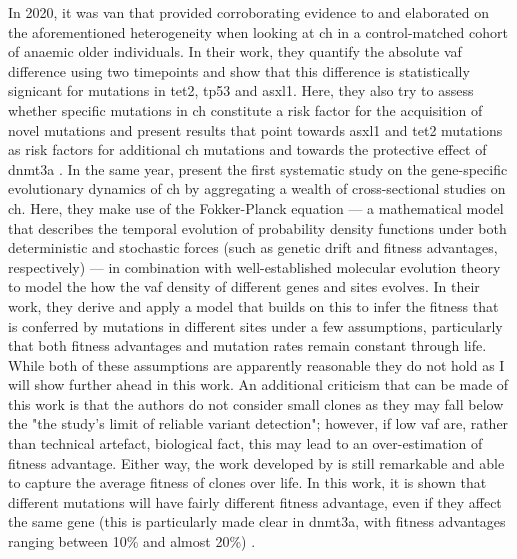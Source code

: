 In 2020, it was van  that provided corroborating evidence to and elaborated on the aforementioned heterogeneity when looking at \ac{ch} in a control-matched cohort of anaemic older individuals. In their work, they quantify the absolute \ac{vaf} difference using two timepoints and show that this difference is statistically signicant for mutations in \ac{tet2}, \ac{tp53} and \ac{asxl1}. Here, they also try to assess whether specific mutations in \ac{ch} constitute a risk factor for the acquisition of novel mutations and present results that point towards \ac{asxl1} and \ac{tet2} mutations as risk factors for additional \ac{ch} mutations and towards the protective effect of \ac{dnmt3a} \cite{Van_Zeventer2020-pw}. In the same year,  present the first systematic study on the gene-specific evolutionary dynamics of \ac{ch} by aggregating a wealth of cross-sectional studies on \ac{ch}. Here, they make use of the Fokker-Planck equation --- a mathematical model that describes the temporal evolution of probability density functions under both deterministic and stochastic forces (such as genetic drift and fitness advantages, respectively) --- in combination with well-established molecular evolution theory to model the how the \ac{vaf} density of different genes and sites evolves. In their work, they derive and apply a model that builds on this to infer the fitness that is conferred by mutations in different sites under a few assumptions, particularly that both fitness advantages and mutation rates remain constant through life. While both of these assumptions are apparently reasonable they do not hold as I will show further ahead in this work. An additional criticism that can be made of this work is that the authors do not consider small clones as they may fall below the "the study's limit of reliable variant detection"; however, if low \ac{vaf} are, rather than technical artefact, biological fact, this may lead to an over-estimation of fitness advantage. Either way, the work developed by  is still remarkable and able to capture the average fitness of clones over life. In this work, it is shown that different mutations will have fairly different fitness advantage, even if they affect the same gene (this is particularly made clear in \ac{dnmt3a}, with fitness advantages ranging between 10\% and almost 20\%) \cite{Watson2020-pz}.


